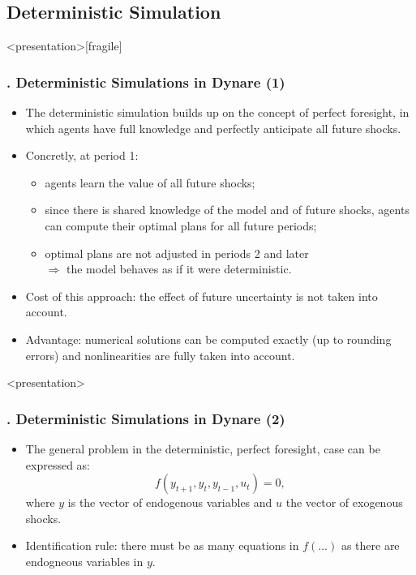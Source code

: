 \documentclass[11pt,aspectratio=169]{beamer}
\begin{document}
\subsection{Deterministic Simulation}
\begin{frame}<presentation>[fragile]
	\frametitle{{\thesection.\thesubsection} Deterministic Simulations in Dynare (1)}
	\begin{itemize}
		\justifying
		\item The deterministic simulation builds up on the concept of perfect foresight, in which agents have full knowledge and perfectly anticipate all future shocks.
		\item Concretly, at period 1:
		\begin{itemize}
			\item agents learn the value of all future shocks;
			\item since there is shared knowledge of the model and of future shocks, agents can compute their optimal plans for all future periods;
			\item optimal plans are not adjusted in periods 2 and later\\ $\Rightarrow$ the model behaves as if it were deterministic.
		\end{itemize}
		\item Cost of this approach: the effect of future uncertainty is not taken into account.
		\item Advantage: numerical solutions can be computed exactly (up to rounding errors) and nonlinearities are fully taken into account.
	\end{itemize}
\end{frame}
\begin{frame}<presentation>
	\frametitle{{\thesection.\thesubsection} Deterministic Simulations in Dynare (2)}
	\begin{itemize}
		\item The general problem in the deterministic, perfect foresight, case can be expressed as: $$f(y_{t+1},y_t,y_{t-1},u_t)=0,$$ where $y$ is the vector of endogenous variables and $u$ the vector of exogenous shocks.
		\item Identification rule: there must be as many equations in $f(...)$ as there are endogneous variables in $y$.
	\end{itemize}
\end{frame}
\end{document}
